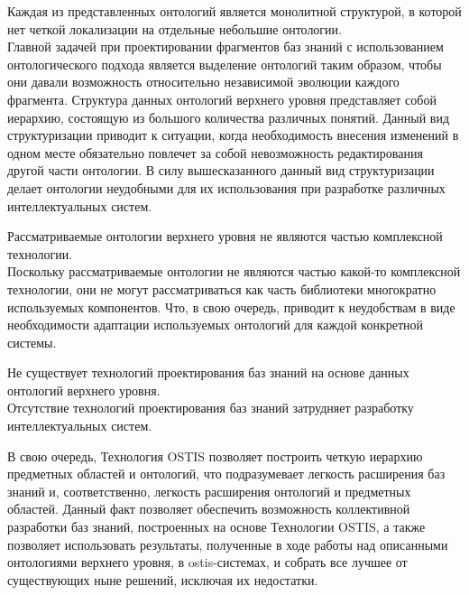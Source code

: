 \begin{SCn}
\begin{scnsubstruct}
\begin{scnsubstruct}
\begin{scnindent}
{            		\begin{scnitemize}
	            		\item Каждая из представленных онтологий является монолитной структурой, в которой нет четкой локализации на отдельные небольшие онтологии.
	            		\\Главной задачей при проектировании фрагментов баз знаний с использованием онтологического подхода	является выделение онтологий таким образом, чтобы они давали возможность относительно независимой эволюции каждого фрагмента. Структура данных онтологий верхнего уровня представляет собой иерархию, состоящую из большого количества различных понятий. Данный вид структуризации приводит к ситуации, когда необходимость внесения изменений в одном месте обязательно повлечет за собой невозможность редактирования другой части онтологии. В силу вышесказанного данный вид структуризации делает онтологии неудобными для их использования при разработке различных интеллектуальных систем.
	            		\item Рассматриваемые онтологии верхнего уровня не являются частью комплексной технологии.
	            		\\Поскольку рассматриваемые онтологии не являются частью какой-то комплексной технологии, они не могут рассматриваться как часть библиотеки многократно используемых компонентов. Что, в свою очередь, приводит к неудобствам в виде необходимости адаптации используемых онтологий для каждой конкретной системы.
	            		\item Не существует технологий проектирования баз знаний на основе данных онтологий верхнего уровня.
	            		\\Отсутствие технологий проектирования баз знаний затрудняет разработку интеллектуальных систем.
            		\end{scnitemize}
            	В свою очередь, Технология OSTIS позволяет построить четкую иерархию предметных областей и онтологий, что подразумевает легкость расширения баз знаний и, соответственно, легкость расширения онтологий и предметных областей. Данный факт позволяет обеспечить возможность коллективной разработки баз знаний, построенных на основе Технологии OSTIS, а также позволяет использовать результаты, полученные в ходе работы над описанными онтологиями верхнего уровня, в ostis-системах, и собрать все лучшее от существующих ныне решений, исключая их недостатки.}
            \end{scnindent}
 

\end{scnsubstruct}
\end{scnsubstruct}
\end{SCn}
